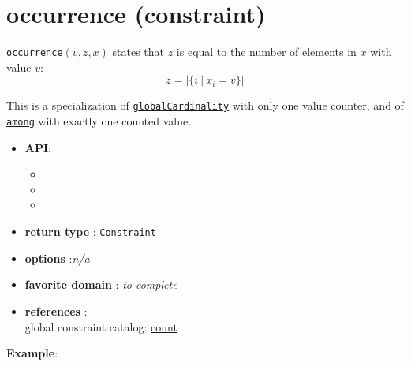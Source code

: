 \label{occurrence}
\hypertarget{occurrence}{}

\section{occurrence (constraint)}\label{occurrence:occurrenceconstraint}\hypertarget{occurrence:occurrenceconstraint}{}
\begin{notedef}
  \texttt{occurrence}$(v,z,x)$ states that $z$ is equal to the number of elements in $x$ with value $v$:
$$z=|\{i\ |\ x_i=v\}|$$   
\end{notedef}
  This is a specialization of \hyperlink{globalcardinality:globalcardinalityconstraint}{\tt globalCardinality} with only one value counter, and of \hyperlink{among:amongconstraint}{\tt among} with exactly one counted value.

\begin{itemize}
	\item \textbf{API}: 
      \begin{itemize}
      \item {}
      \item {}
      \item {}
      \end{itemize}
	\item \textbf{return type} : \texttt{Constraint}
	\item \textbf{options} :\emph{n/a}
	\item \textbf{favorite domain} : \emph{to complete}
	\item \textbf{references} :\\
      global constraint catalog: \href{http://www.emn.fr/x-info/sdemasse/gccat/Ccount.html}{count}
\end{itemize}

\textbf{Example}:

